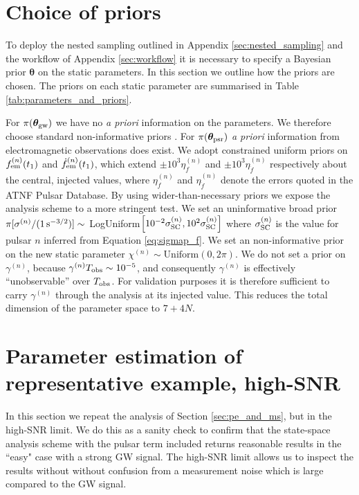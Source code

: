 \documentclass[fleqn,usenatbib,useAMS]{mnras}
\begin{document}
\section{Choice of priors}\label{sec:set_priors}
To deploy the nested sampling outlined in Appendix \ref{sec:nested_sampling} and the workflow of Appendix \ref{sec:workflow} it is necessary to specify a Bayesian prior $\boldsymbol{\theta}$ on the static parameters. In this section we outline how the priors are chosen. The priors on each static parameter are summarised in Table \ref{tab:parameters_and_priors}.  \newline 

For $\pi(\boldsymbol{\theta}_{\rm gw})$ we have no \textit{a priori} information on the parameters. We therefore choose standard non-informative priors \citep[e.g.][]{Bhagwat2021}. For $\pi(\boldsymbol{\theta}_{\rm psr})$ \textit{a priori} information from electromagnetic observations does exist. We adopt constrained uniform priors on $f_{\rm em}^{(n)}(t_1)$ and $\dot{f}_{\rm em}^{(n)}(t_1)$, which extend $\pm 10^3 \eta_f^{(n)}$ and $\pm 10^3 \eta_{\dot{f}}^{(n)}$ respectively about the central, injected values, where $\eta_f^{(n)}$ and $\eta_{\dot{f}}^{(n)}$ denote the errors quoted in the ATNF Pulsar Database. By using wider-than-necessary priors we expose the analysis scheme to a more stringent test. We set an uninformative broad prior $\pi[\sigma^{(n)} / (1 \, {\rm s^{-3/2}})] \sim$ LogUniform$ \left [10^{-2} \sigma_{\rm SC}^{(n)}, 10^2 \sigma_{\rm SC}^{(n)} \right ]$
where $\sigma_{\rm SC}^{(n)}$ is the value for pulsar $n$ inferred from
Equation \eqref{eq:sigmap_f}. We set an non-informative prior on the new static parameter $\chi^{(n)} \sim \text{Uniform}\left(0,2\pi\right)$. We do not set a prior on $\gamma^{(n)}$, because $\gamma^{(n)} T_{\rm obs} \sim 10^{-5}$, and consequently $\gamma^{(n)}$ is effectively ``unobservable'' over $T_{\rm obs}$. For validation purposes it is therefore sufficient to carry $\gamma^{(n)}$ through the analysis at its injected value. This reduces the total dimension of the parameter space to $7 + 4N$. \newline 













\section{Parameter estimation of representative example,  high-SNR} \label{sec:app_high_SNR}
In this section we repeat the analysis of Section \ref{sec:pe_and_ms}, but in the high-SNR limit. We do this as a sanity check to confirm that the state-space analysis scheme with the pulsar term included returns reasonable results in the ``easy" case with a strong GW signal. The high-SNR limit allows us to inspect the results without without confusion from a measurement noise which is large compared to the GW signal. \newline 
\end{document}

